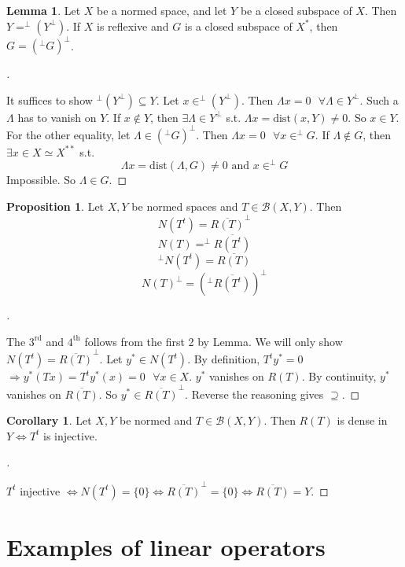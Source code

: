 \documentclass{article}
\theoremstyle{definition}
\newtheorem{lem}{Lemma}
\newtheorem{cor}{Corollary}
\newtheorem{prop}{Proposition}
\newenvironment{proofs}[1][\proofname]{%
  \begin{proof}[#1]$ $\par\nobreak\ignorespaces
}{%
  \end{proof}
}
\newcommand{\sfa}{\text{  } \forall}
\begin{document}
\begin{lem}
	Let $X$ be a normed space, and let $Y$ be a closed subspace of $X$.
	Then $Y = ^\perp(Y^\perp)$.
	If $X$ is reflexive and $G$ is a closed subspace of $X^*$, then $G = (^\perp G)^\perp$.
\end{lem}

\begin{proofs}
	It suffices to show $^\perp(Y^\perp) \subseteq Y$.
	Let $x \in ^\perp(Y^\perp)$.
	Then $\Lambda x = 0 \sfa \Lambda \in Y^\perp$.
	Such a $\Lambda$ has to vanish on $Y$.
	If $x \notin Y$, then $\exists \Lambda \in Y^\perp$ s.t. $\Lambda x = \text{dist}(x, Y) \neq 0$.
	So $x \in Y$.
	For the other equality, let $\Lambda \in (^\perp G)^\perp$.
	Then $\Lambda x = 0 \sfa x \in ^\perp G$.
	If $\Lambda \notin G$, then $\exists x \in X \simeq X^{**}$ s.t. 
	\[
		\Lambda x = \text{dist} (\Lambda, G) \neq 0 \text{ and } x \in ^\perp G
	\]
	Impossible.
	So $\Lambda \in G$.
\end{proofs}

\begin{prop}
	Let $X, Y$ be normed spaces and $T \in \mathcal{B}(X, Y)$.
	Then 
	\[
		N(T^t) = \overline{R(T)}^\perp
	\]
	\[
		N(T) = ^\perp \overline{R(T^t)}
	\]
	\[
		^\perp N(T^t) = \overline{R(T)}
	\]
	\[
		N(T)^\perp = (^\perp \overline{R(T^t)})^\perp
	\]
\end{prop}

\begin{proofs}
	The $3^{\text{rd}}$ and $4^{\text{th}}$ follows from the first 2 by Lemma.
	We will only show $N(T^t) = \overline{R(T)}^\perp$.
	Let $y^* \in N(T^t)$.
	By definition, $T^t y^* = 0$
	$\Rightarrow y^*(T x) = T^t y^*(x) = 0 \sfa x \in X$.
	$y^*$ vanishes on $R(T)$.
	By continuity, $y^*$ vanishes on $\overline{R(T)}$.
	So $y^* \in \overline{R(T)}^\perp$.
	Reverse the reasoning gives $\supseteq$.
\end{proofs}

\begin{cor}
	Let $X, Y$ be normed and $T \in \mathcal{B}(X, Y)$.
	Then $R(T)$ is dense in $Y \Leftrightarrow T^t$ is injective.
\end{cor}

\begin{proofs}
	$T^t$ injective $\Leftrightarrow N(T^t) = \{0\} \Leftrightarrow \overline{R(T)}^\perp = \{0\} \Leftrightarrow \overline{R(T)} = Y$.
\end{proofs}

\section*{Examples of linear operators}
\end{document}
